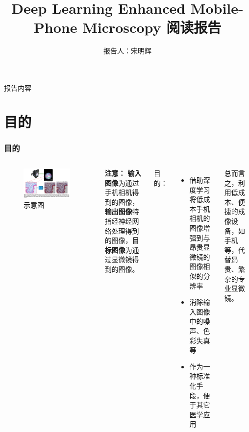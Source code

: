 \documentclass{beamer}
\title{Deep Learning Enhanced Mobile-Phone Microscopy 阅读报告}
\author{报告人：宋明辉}
\begin{document}

\frame[plain]{
\titlepage
}

\begin{frame}{报告内容}
\tableofcontents[
sectionstyle=show/show,
subsectionstyle=hide/hide/hide
]
\end{frame}

\AtBeginSection{
\begin{frame}
\tableofcontents[
currentsection,
]
\end{frame}
}

\section{目的}

\begin{frame}
\frametitle{目的}

\begin{columns}
\begin{figure}
\centering
\includegraphics[width=0.9\textwidth]{Diagram1.png}
\caption{示意图} 
\end{figure}
\textbf{注意：}
\textbf{输入图像}为通过手机相机得到的图像，\textbf{输出图像}特指经神经网络处理得到的图像，\textbf{目标图像}为通过显微镜得到的图像。

{}
目的：
\begin{itemize}
\item 借助深度学习将低成本手机相机的图像增强到与昂贵显微镜的图像相似的分辨率
\item 消除输入图像中的噪声、色彩失真等
\item 作为一种标准化手段，便于其它医学应用
\end{itemize}

总而言之，利用低成本、便捷的成像设备，如手机等，代替昂贵、繁杂的专业显微镜。


\end{columns}

\end{frame}
\end{document}

